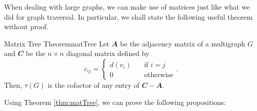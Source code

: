 \documentclass[math]{amznotes}
\theoremstyle{remark}
\begin{document}
When dealing with large graphs, we can make use of matrices just like what we did for graph traversal. In particular, we shall state the following useful theorem without proof.
\begin{thmbox}{Matrix Tree Theorem}{matTree}
    Let $\mathbfit{A}$ be the adjacency matrix of a multigraph $G$ and $\mathbfit{C}$ be the $n \times n$ diagonal matrix defined by
    \begin{equation*}
        c_{ij} = \begin{cases}
            d(v_i) & \quad\textrm{if } i = j \\
            0 & \quad\textrm{otherwise}
        \end{cases}.
    \end{equation*}
    Then, $\tau(G)$ is the cofactor of any entry of $\mathbfit{C - A}$. 
\end{thmbox}
Using Theorem \ref{thm:matTree}, we can prove the following propositions:
\end{document}
